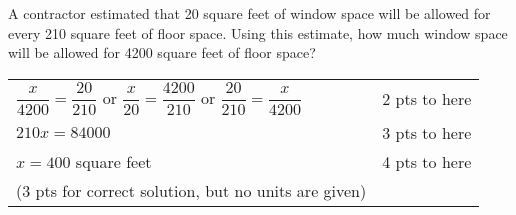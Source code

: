 
{
	A contractor estimated that 20 square feet of window space will be allowed for every 210 square feet of floor space.  Using this estimate, how much window space will be allowed for 4200 square feet of floor space?
}
{
\begin{tabular}{l r}
	$\dfrac{x}{4200}=\dfrac{20}{210}$ or 
	$\dfrac{x}{20}=\dfrac{4200}{210}$ or 
	$\dfrac{20}{210}=\dfrac{x}{4200}$ & 2 pts to here\\
	$210x=84000$ & 3 pts to here\\
	$x=400$ square feet & 4 pts to here \\
	(3 pts for correct solution, but no units are given)
	\end{tabular}	
}

